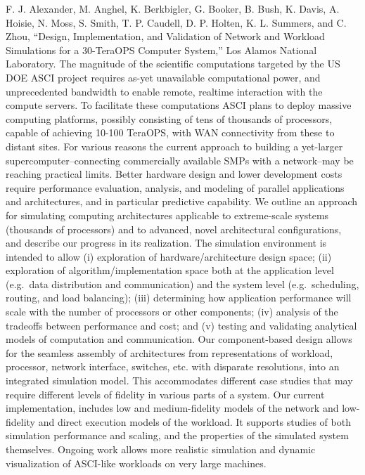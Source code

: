 \documentclass[]{article}
\begin{document}
F. J. Alexander, M. Anghel, K. Berkbigler, G. Booker, B. Bush, K. Davis,
A. Hoisie, N. Moss, S. Smith, T. P. Caudell, D. P. Holten, K. L.
Summers, and C. Zhou, ``Design, Implementation, and Validation of
Network and Workload Simulations for a 30-TeraOPS Computer System,'' Los
Alamos National Laboratory. The magnitude of the scientific computations
targeted by the US DOE ASCI project requires as-yet unavailable
computational power, and unprecedented bandwidth to enable remote,
realtime interaction with the compute servers. To facilitate these
computations ASCI plans to deploy massive computing platforms, possibly
consisting of tens of thousands of processors, capable of achieving
10-100 TeraOPS, with WAN connectivity from these to distant sites. For
various reasons the current approach to building a yet-larger
supercomputer--connecting commercially available SMPs with a
network--may be reaching practical limits. Better hardware design and
lower development costs require performance evaluation, analysis, and
modeling of parallel applications and architectures, and in particular
predictive capability. We outline an approach for simulating computing
architectures applicable to extreme-scale systems (thousands of
processors) and to advanced, novel architectural configurations, and
describe our progress in its realization. The simulation environment is
intended to allow (i) exploration of hardware/architecture design space;
(ii) exploration of algorithm/implementation space both at the
application level (e.g.~data distribution and communication) and the
system level (e.g.~scheduling, routing, and load balancing); (iii)
determining how application performance will scale with the number of
processors or other components; (iv) analysis of the tradeoffs between
performance and cost; and (v) testing and validating analytical models
of computation and communication. Our component-based design allows for
the seamless assembly of architectures from representations of workload,
processor, network interface, switches, etc. with disparate resolutions,
into an integrated simulation model. This accommodates different case
studies that may require different levels of fidelity in various parts
of a system. Our current implementation, includes low and
medium-fidelity models of the network and low-fidelity and direct
execution models of the workload. It supports studies of both simulation
performance and scaling, and the properties of the simulated system
themselves. Ongoing work allows more realistic simulation and dynamic
visualization of ASCI-like workloads on very large machines.
\end{document}

